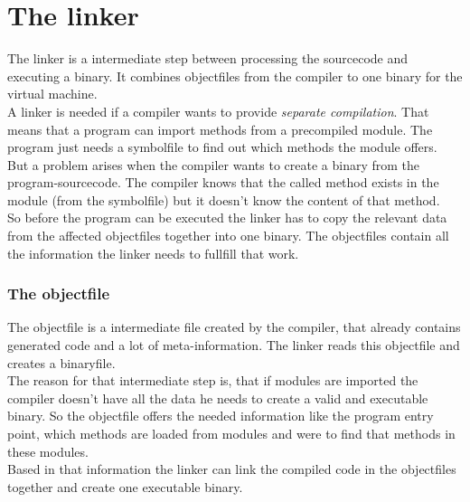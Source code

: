 \part{The linker}
The linker is a intermediate step between processing the sourcecode and executing a
binary. It combines objectfiles from the compiler to one binary for the virtual
machine. 
\\
A linker is needed if a compiler wants to provide \emph{separate compilation}.
That means that a program can import methods from a precompiled module. The
program just needs a symbolfile to find out which methods the module offers. \\
But a problem arises when the compiler wants to create a binary from the
program-sourcecode. The compiler knows that the called method exists in the
module (from the symbolfile) but it doesn't know the content of that method. \\
So before the program can be executed the linker has to copy the relevant data
from the affected objectfiles together into one binary. The objectfiles contain
all the information the linker needs to fullfill that work.    

\section{The objectfile}
\label{objectfile}
The objectfile is a intermediate file created by the compiler, that already
contains generated code and a lot of meta-information. The linker reads this
objectfile and creates a binaryfile. \\
The reason for that intermediate step is, that if modules are imported the
compiler doesn't have all the data he needs to create a valid and executable binary. 
So the objectfile offers the needed information like the program entry point, which
methods are loaded from modules and were to find that methods in these modules. \\
Based in that information the linker can link the compiled code in the
objectfiles together and create one executable binary.

